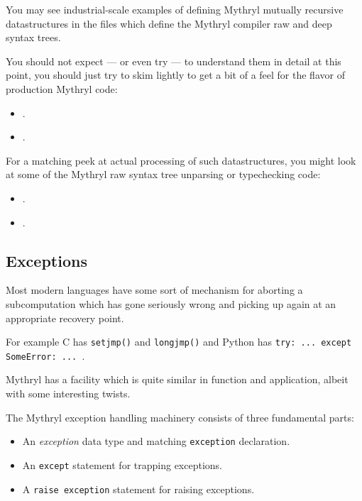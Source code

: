 You may see industrial-scale examples of defining Mythryl mutually 
recursive datastructures in the files which define the Mythryl compiler  
raw and deep syntax trees.

You should not expect --- or even try --- to understand them in detail 
at this point, you should just try to skim lightly 
to get a bit of a feel for the flavor of production Mythryl code:

\begin{itemize}
\item {}.
\item {}.
\end{itemize}

For a matching peek at actual processing of such datastructures, you might 
look at some of the Mythryl raw syntax tree unparsing or typechecking code:

\begin{itemize}
\item {}.
\item {}.
\end{itemize}

\cutend*


\subsection{Exceptions}

Most modern languages have some sort of mechanism for aborting 
a subcomputation which has gone seriously wrong and picking up 
again at an appropriate recovery point.

For example C has {\tt setjmp()} and {\tt longjmp()} and Python 
has {\tt try: ... except SomeError: ... }.

Mythryl has a facility which is quite similar in function and 
application, albeit with some interesting twists.

The Mythryl exception handling machinery consists of three 
fundamental parts:
\begin{itemize}
\item An {\it exception} data type and matching {\tt exception} declaration.
\item An {\tt except} statement for trapping exceptions.
\item A {\tt raise exception} statement for raising exceptions.
\end{itemize}

